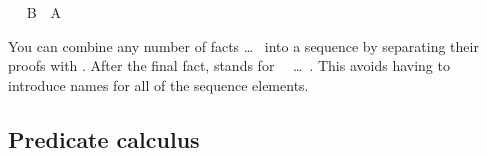 \begin{isabellebody}
\ \isamarkupfalse%
\ {}B\ {}\ A{}\ \isamarkupfalse%
\isanewline
{}\isamarkupfalse%
%
\endisatagproof
{\isafoldproof}%
%
\isadelimproof
%
\endisadelimproof
%
\begin{isamarkuptext}%
\noindent You can combine any number of facts  \dots\  into a sequence by separating their proofs with
. After the final fact,  stands
for ~~\dots~.  This avoids having to
introduce names for all of the sequence elements.


\subsection{Predicate calculus}


\end{isamarkuptext}
\end{isabellebody}

